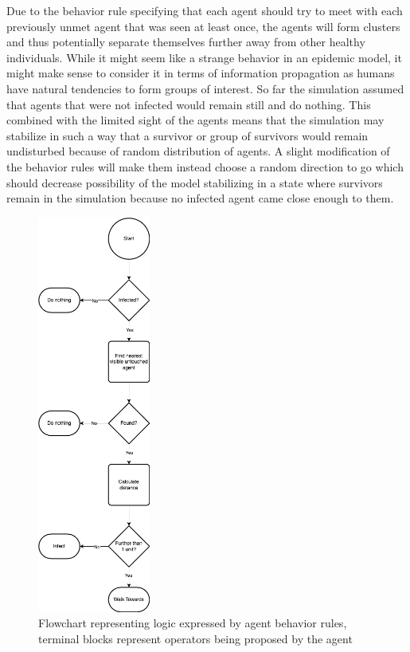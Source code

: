 Due to the behavior rule specifying that each agent should try to meet with each previously unmet agent that was seen at least once, the agents will form clusters and thus potentially separate themselves further away from other healthy individuals.
While it might seem like a strange behavior in an epidemic model, it might make sense to consider it in terms of information propagation as humans have natural tendencies to form groups of interest.
So far the simulation assumed that agents that were not infected would remain still and do nothing.
This combined with the limited sight of the agents means that the simulation may stabilize in such a way that a survivor or group of survivors would remain undisturbed because of random distribution of agents.
A slight modification of the behavior rules will make them instead choose a random direction to go which should decrease possibility of the model stabilizing in a state where survivors remain in the simulation because no infected agent came close enough to them.


\begin{figure}[H]
    \centering
    \includegraphics[width=0.33\textwidth]{images/chapter2/sir_logic.drawio.png}
    \caption{Flowchart representing logic expressed by agent behavior rules, terminal blocks represent operators being proposed by the agent}\label{fig:sir_logic.drawio.png}
\end{figure}

